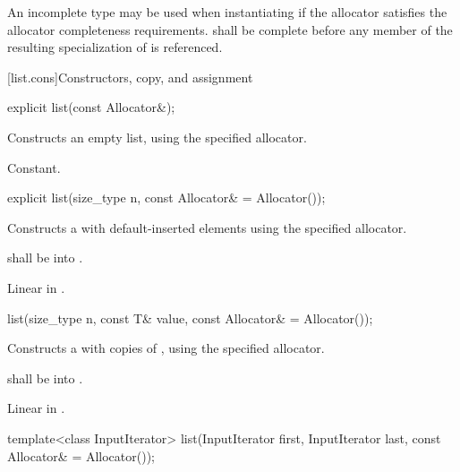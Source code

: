 \pnum
An incomplete type  may be used when instantiating 
if the allocator satisfies the
allocator completeness requirements.
 shall be complete before any member of the resulting specialization
of  is referenced.

[list.cons]{Constructors, copy, and assignment}

%
\begin{itemdecl}
explicit list(const Allocator&);
\end{itemdecl}

\begin{itemdescr}
\pnum
\effects
Constructs an empty list, using the specified allocator.

\pnum
\complexity
Constant.
\end{itemdescr}

%
\begin{itemdecl}
explicit list(size_type n, const Allocator& = Allocator());
\end{itemdecl}

\begin{itemdescr}
\pnum
\effects Constructs a  with
 default-inserted elements using the specified allocator.

\pnum
\requires {} shall be  into .

\pnum
\complexity
Linear in
.
\end{itemdescr}

%
\begin{itemdecl}
list(size_type n, const T& value, const Allocator& = Allocator());
\end{itemdecl}

\begin{itemdescr}
\pnum
\effects
Constructs a
with
copies of
,
using the specified allocator.

\pnum
\requires {} shall be  into .

\pnum
\complexity
Linear in
.
\end{itemdescr}

%
\begin{itemdecl}
template<class InputIterator>
  list(InputIterator first, InputIterator last, const Allocator& = Allocator());
\end{itemdecl}

